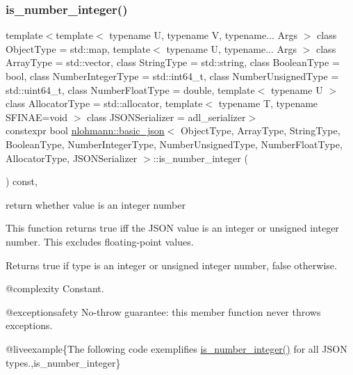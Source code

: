 \subsubsection{\texorpdfstring{is\_number\_integer()}{is\_number\_integer()}}
{\footnotesize\ttfamily template$<$template$<$ typename U, typename V, typename... Args $>$ class Object\+Type = std\+::map, template$<$ typename U, typename... Args $>$ class Array\+Type = std\+::vector, class String\+Type  = std\+::string, class Boolean\+Type  = bool, class Number\+Integer\+Type  = std\+::int64\+\_\+t, class Number\+Unsigned\+Type  = std\+::uint64\+\_\+t, class Number\+Float\+Type  = double, template$<$ typename U $>$ class Allocator\+Type = std\+::allocator, template$<$ typename T, typename S\+F\+I\+N\+A\+E=void $>$ class J\+S\+O\+N\+Serializer = adl\+\_\+serializer$>$ \\
constexpr bool \mbox{\hyperlink{classnlohmann_1_1basic__json}{nlohmann\+::basic\+\_\+json}}$<$ Object\+Type, Array\+Type, String\+Type, Boolean\+Type, Number\+Integer\+Type, Number\+Unsigned\+Type, Number\+Float\+Type, Allocator\+Type, J\+S\+O\+N\+Serializer $>$\+::is\+\_\+number\+\_\+integer (\begin{DoxyParamCaption}{ }\end{DoxyParamCaption}) const\hspace{0.3cm}{\ttfamily [inline]}, {\ttfamily [noexcept]}}



return whether value is an integer number 

This function returns true iff the J\+S\+ON value is an integer or unsigned integer number. This excludes floating-\/point values.

\begin{DoxyReturn}{Returns}
{\ttfamily true} if type is an integer or unsigned integer number, {\ttfamily false} otherwise.
\end{DoxyReturn}
@complexity Constant.

@exceptionsafety No-\/throw guarantee\+: this member function never throws exceptions.

@liveexample\{The following code exemplifies {\ttfamily \mbox{\hyperlink{classnlohmann_1_1basic__json_abac8af76067f1e8fdca9052882c74428}{is\+\_\+number\+\_\+integer()}}} for all J\+S\+ON types.,is\+\_\+number\+\_\+integer\}

